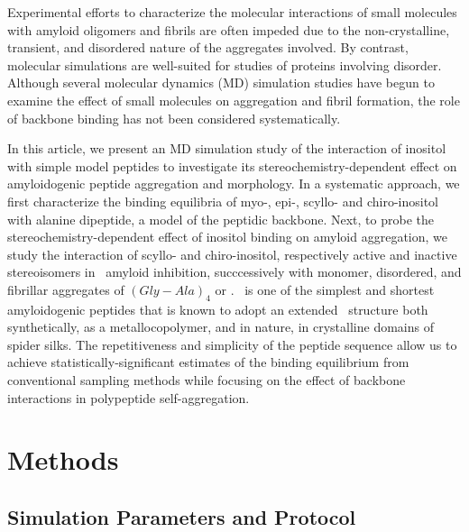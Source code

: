 Experimental efforts to characterize the molecular interactions of small molecules with amyloid oligomers and fibrils are often impeded due to the non-crystalline, transient, and disordered nature of the aggregates involved. By contrast, molecular simulations are well-suited for studies of proteins involving disorder.\cite{Rauscher:2010p88} Although several molecular dynamics (MD) simulation studies have begun to examine the effect of small molecules on aggregation and fibril formation,\cite{Takeda:2010p34,Raman:2009p47,Lemkul:2010p23,Liu:2009p18} the role of backbone binding has not been considered systematically.

In this article, we present an MD simulation study of the interaction of inositol with simple model peptides to investigate its stereochemistry-dependent effect on amyloidogenic peptide aggregation and morphology. In a systematic approach, we first characterize the binding equilibria of myo-, epi-, scyllo- and chiro-inositol with alanine dipeptide, a model of the peptidic backbone. Next, to probe the stereochemistry-dependent effect of inositol binding on amyloid aggregation, we study the interaction of scyllo- and chiro-inositol, respectively active and inactive stereoisomers in \abeta\ amyloid inhibition, succcessively with monomer, disordered, and fibrillar aggregates of $(Gly-Ala)_4$ or \gafour. \gafour\ is one of the simplest and shortest amyloidogenic peptides that is known to adopt an extended \bsheet\ structure both synthetically,\cite{Rathore:2001p37} as a metallocopolymer,\cite{Vandermeulen:2006p15} and in nature, in crystalline domains of spider silks.\cite{Kenney:2002p45,Fossey:1991fk} The repetitiveness and simplicity of the peptide sequence allow us to achieve statistically-significant estimates of the binding equilibrium from conventional sampling methods while focusing on the effect of backbone interactions in polypeptide self-aggregation. 

\section{Methods}

\subsection{Simulation Parameters and Protocol}


